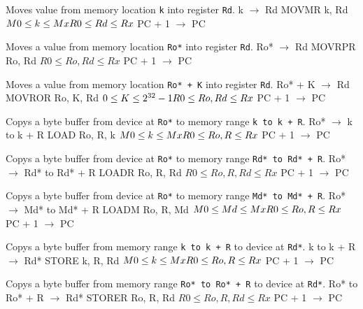 \documentclass[titlepage]{scrartcl}
\begin{document}
{Moves value from memory location \texttt{k} into register \texttt{Rd}.}
{k $\rightarrow$ Rd}
{MOVMR k, Rd}
{$M0 \leq k \leq Mx \hfill \break R0 \leq Rd \leq Rx$}
{PC + 1 $\rightarrow$ PC}
{}
{\srtable{}{}{}{}}

{Moves a value from memory location \texttt{Ro*} into register \texttt{Rd}.}
{Ro* $\rightarrow$ Rd}
{MOVRPR Ro, Rd}
{$R0 \leq Ro, Rd \leq Rx$}
{PC + 1 $\rightarrow$ PC}
{}
{\srtable{}{}{}{}}

{Moves a value from memory location \texttt{Ro* + K} into register \texttt{Rd}.}
{Ro* + K $\rightarrow$ Rd}
{MOVROR Ro, K, Rd}
{$0 \leq K \leq 2^{32} - 1 \hfill \break R0 \leq Ro, Rd \leq Rx$}
{PC + 1 $\rightarrow$ PC}
{}
{\srtable{}{}{}{}}

{Copys a byte buffer from device at \texttt{Ro*} to memory range \texttt{k to k + R}.}
{Ro* $\rightarrow$ k to k + R}
{LOAD Ro, R, k}
{$M0 \leq k \leq Mx \hfill \break R0 \leq Ro, R \leq Rx$}
{PC + 1 $\rightarrow$ PC}
{}
{\srtable{}{}{}{}}

{Copys a byte buffer from device at \texttt{Ro*} to memory range \texttt{Rd* to Rd* + R}.}
{Ro* $\rightarrow$ Rd* to Rd* + R}
{LOADR Ro, R, Rd}
{$R0 \leq Ro, R, Rd \leq Rx$}
{PC + 1 $\rightarrow$ PC}
{}
{\srtable{}{}{}{}}

{Copys a byte buffer from device at \texttt{Ro*} to memory range \texttt{Md* to Md* + R}.}
{Ro* $\rightarrow$ Md* to Md* + R}
{LOADM Ro, R, Md}
{$M0 \leq Md \leq Mx \hfill \break R0 \leq Ro, R \leq Rx$}
{PC + 1 $\rightarrow$ PC}
{}
{\srtable{}{}{}{}}

{Copys a byte buffer from memory range \texttt{k to k + R} to device at \texttt{Rd*}.}
{k to k + R $\rightarrow$ Rd*}
{STORE k, R, Rd}
{$M0 \leq k \leq Mx \hfill \break R0 \leq Ro, R \leq Rx$}
{PC + 1 $\rightarrow$ PC}
{}
{\srtable{}{}{}{}}

{Copys a byte buffer from memory range \texttt{Ro* to Ro* + R} to device at \texttt{Rd*}.}
{Ro* to Ro* + R $\rightarrow$ Rd*}
{STORER Ro, R, Rd}
{$R0 \leq Ro, R, Rd \leq Rx$}
{PC + 1 $\rightarrow$ PC}
{}
{\srtable{}{}{}{}}
\end{document}

